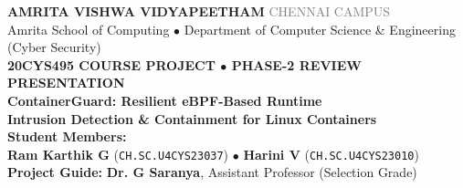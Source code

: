 \documentclass[aspectratio=169,10pt]{beamer}
\begin{document}
{
\begin{frame}[plain]
  \vspace{0.4cm}
  \begin{center}
    {\fontsize{7.5pt}{8.5pt}\selectfont \textbf{\textcolor{crimsonDark}{AMRITA VISHWA VIDYAPEETHAM}} \quad \textbar \quad \textcolor{gray}{CHENNAI CAMPUS}}\\[0.1cm]
    {\fontsize{8.5pt}{9.5pt}\selectfont \textcolor{navyDark}{Amrita School of Computing \quad $\bullet$ \quad Department of Computer Science \& Engineering (Cyber Security)}}\\[0.35cm]

    {\fontsize{10pt}{11pt}\selectfont \textbf{\textcolor{blueAccent}{20CYS495 COURSE PROJECT \quad $\bullet$ \quad PHASE-2 REVIEW PRESENTATION}}}\\[0.2cm]

    {\fontsize{15pt}{17pt}\selectfont \textbf{\textcolor{blueBrand}{ContainerGuard: Resilient eBPF-Based Runtime}}\\[0.05cm]
    \textbf{\textcolor{blueBrand}{Intrusion Detection \& Containment for Linux Containers}}}\\[0.3cm]

    \small
    \textbf{Student Members:}\\[0.05cm]
    \textbf{Ram Karthik G} (\texttt{CH.SC.U4CYS23037}) \quad $\bullet$ \quad \textbf{Harini V} (\texttt{CH.SC.U4CYS23010})\\[0.15cm]
    \small \textbf{Project Guide:} \textbf{Dr. G Saranya}, Assistant Professor (Selection Grade)
  \end{center}

  \vspace{0.2cm}
  \centering
\end{frame}
}
\end{document}

